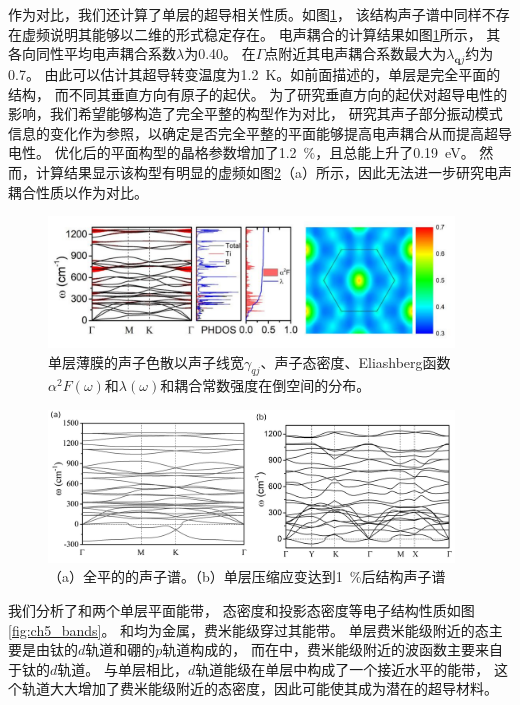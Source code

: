作为对比，我们还计算了单层的超导相关性质。如图\ref{fig:ch5_tib9_phonon}，
该结构声子谱中同样不存在虚频说明其能够以二维的形式稳定存在。
电声耦合的计算结果如图\ref{fig:ch5_tib9_phonon}所示，
其各向同性平均电声耦合系数$\lambda$为0.40。
在$\Gamma$点附近其电声耦合系数最大为$\lambda_{\bm{q}j}$约为0.7。
由此可以估计其超导转变温度为\SI{1.2}{\kelvin}。如前面描述的，单层是完全平面的结构，
而不同其垂直方向有原子的起伏。
为了研究垂直方向的起伏对超导电性的影响，我们希望能够构造了完全平整的构型作为对比，
研究其声子部分振动模式信息的变化作为参照，以确定是否完全平整的平面能够提高电声耦合从而提高超导电性。
优化后的平面构型的晶格参数增加了\SI{1.2}{\percent}，且总能上升了\SI{0.19}{\eV}。
然而，计算结果显示该构型有明显的虚频如图\ref{fig:ch5_tib7_tib9_pd}（a）所示，因此无法进一步研究电声耦合性质以作为对比。

\begin{figure}[htb]
  \includegraphics[width=0.96\textwidth]{figs/ch5_tib9_phonon.png}
  \centering
  \caption{单层薄膜的声子色散以声子线宽$\gamma_{qj}$、声子态密度、Eliashberg函数$\alpha^2 F(\omega)$和$\lambda(\omega)$和耦合常数强度在倒空间的分布。}
  \label{fig:ch5_tib9_phonon}
\end{figure}

\begin{figure}
  \includegraphics[width=0.96\textwidth]{figs/ch5_tib7_tib9_pd.png}
  \centering
  \caption{（a）全平的的声子谱。（b）单层压缩应变达到\SI{1}{\percent}后结构声子谱}
  \label{fig:ch5_tib7_tib9_pd}
\end{figure}

我们分析了和两个单层平面能带，
态密度和投影态密度等电子结构性质如图\ref{fig:ch5_bands}。
和均为金属，费米能级穿过其能带。
单层费米能级附近的态主要是由钛的$d$轨道和硼的$p$轨道构成的，
而在中，费米能级附近的波函数主要来自于钛的$d$轨道。
与单层相比，$d$轨道能级在单层中构成了一个接近水平的能带，
这个轨道大大增加了费米能级附近的态密度，因此可能使其成为潜在的超导材料。

